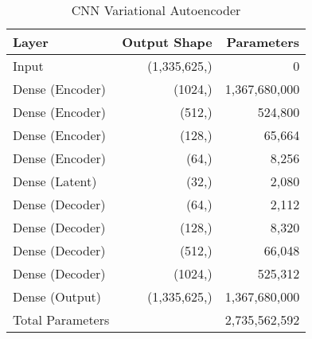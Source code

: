 \begin{table}[h]
    \centering
    \begin{tabular}{lrr}
        \toprule
        Layer & Output Shape & Parameters \\
        \midrule
        Input & (1,335,625,) & 0 \\
        Dense (Encoder) & (1024,) & 1,367,680,000 \\
        Dense (Encoder) & (512,) & 524,800 \\
        Dense (Encoder) & (128,) & 65,664 \\
        Dense (Encoder) & (64,) & 8,256 \\
        Dense (Latent) & (32,) & 2,080 \\
        Dense (Decoder) & (64,) & 2,112 \\
        Dense (Decoder) & (128,) & 8,320 \\
        Dense (Decoder) & (512,) & 66,048 \\
        Dense (Decoder) & (1024,) & 525,312 \\
        Dense (Output) & (1,335,625,) & 1,367,680,000 \\
        \midrule
        Total Parameters & & 2,735,562,592 \\
        \bottomrule
    \end{tabular}
    \caption{CNN Variational Autoencoder}
    \label{tab:a-cnnvae}
\end{table}


